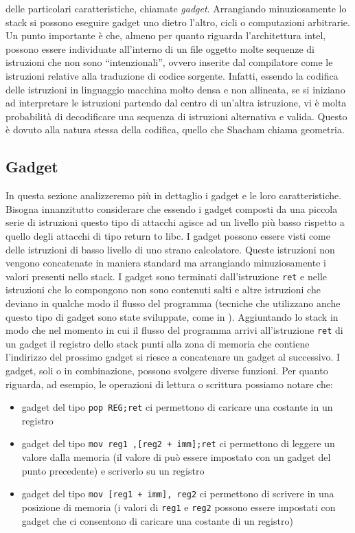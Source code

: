 delle particolari caratteristiche, chiamate \emph{gadget}. Arrangiando
minuziosamente lo stack si possono eseguire gadget uno dietro l'altro,
cicli o computazioni arbitrarie. Un punto importante è che, almeno per
quanto riguarda l'architettura intel, possono essere individuate
all'interno di un file oggetto molte sequenze di istruzioni che non
sono ``intenzionali'', ovvero inserite dal compilatore come le
istruzioni relative alla traduzione di codice sorgente. Infatti,
essendo la codifica delle istruzioni in linguaggio macchina molto
densa e non allineata, se si iniziano ad interpretare le istruzioni
partendo dal centro di un'altra istruzione, vi è molta probabilità di
decodificare una sequenza di istruzioni alternativa e valida. Questo è
dovuto alla natura stessa della codifica, quello che Shacham chiama
geometria.

\subsection{Gadget}

In questa sezione analizzeremo più in dettaglio i gadget e le loro
caratteristiche. Bisogna innanzitutto considerare che essendo i gadget
composti da una piccola serie di istruzioni questo tipo di attacchi
agisce ad un livello più basso rispetto a quello degli attacchi di
tipo return to libc. I gadget possono essere visti come delle
istruzioni di basso livello di uno strano calcolatore. Queste
istruzioni non vengono concatenate in maniera standard ma arrangiando
minuziosamente i valori presenti nello stack. I gadget sono terminati
dall'istruzione \lstinline{ret} e nelle istruzioni che lo compongono
non sono contenuti salti e altre istruzioni che deviano in qualche
modo il flusso del programma (tecniche che utilizzano anche questo
tipo di gadget sono state sviluppate, come in
\cite{JOP}). Aggiuntando lo stack in modo che nel momento in cui il
flusso del programma arrivi all'istruzione \lstinline{ret} di un
gadget il registro dello stack punti alla zona di memoria che contiene
l'indirizzo del prossimo gadget si riesce a concatenare un gadget al
successivo. I gadget, soli o in combinazione, possono svolgere diverse
funzioni. Per quanto riguarda, ad esempio, le operazioni di lettura o
scrittura possiamo notare che:

\begin{itemize}
\item gadget del tipo \lstinline{pop REG;ret} ci permettono di
caricare una costante in un registro

\item gadget del tipo \lstinline{mov reg1 ,[reg2 + imm];ret} ci
  permettono di leggere un valore dalla memoria (il valore di
   può essere impostato con un gadget del punto
  precedente) e scriverlo su un registro

\item gadget del tipo \lstinline{mov [reg1 + imm], reg2} ci permettono
  di scrivere in una posizione di memoria (i valori di
  \lstinline{reg1} e \lstinline{reg2} possono essere impostati con
  gadget che ci consentono di caricare una costante di un registro)
\end{itemize}

